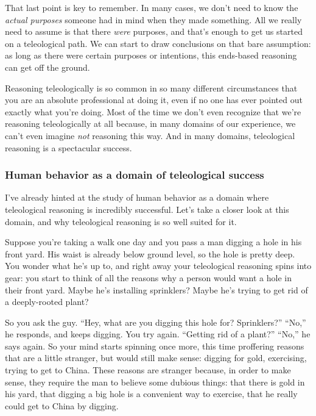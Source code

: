 		That last point is key to remember. In many cases, we don't need to know the \textit{actual purposes} someone had in mind when they made something. All we really need to assume is that there \textit{were} purposes, and that's enough to get us started on a teleological path. We can start to draw conclusions on that bare assumption: as long as there were certain purposes or intentions, this ends-based reasoning can get off the ground.
		
		Reasoning teleologically is so common in so many different circumstances that you are an absolute professional at doing it, even if no one has ever pointed out exactly what you're doing. Most of the time we don't even recognize that we're reasoning teleologically at all because, in many domains of our experience, we can't even imagine \textit{not} reasoning this way. And in many domains, teleological reasoning is a spectacular success.
		
	\subsubsection{Human behavior as a domain of teleological success}
		
		I've already hinted at the study of human behavior as a domain where teleological reasoning is incredibly successful. Let's take a closer look at this domain, and why teleological reasoning is so well suited for it.
		
		Suppose you're taking a walk one day and you pass a man digging a hole in his front yard. His waist is already below ground level, so the hole is pretty deep. You wonder what he's up to, and right away your teleological reasoning spins into gear: you start to think of all the reasons why a person would want a hole in their front yard. Maybe he's installing sprinklers? Maybe he's trying to get rid of a deeply-rooted plant? 
		
		So you ask the guy. ``Hey, what are you digging this hole for? Sprinklers?'' ``No,'' he responds, and keeps digging. You try again. ``Getting rid of a plant?'' ``No,'' he says again. So your mind starts spinning once more, this time proffering reasons that are a little stranger, but would still make sense: digging for gold, exercising, trying to get to China. These reasons are stranger because, in order to make sense, they require the man to believe some dubious things: that there is gold in his yard, that digging a big hole is a convenient way to exercise, that he really could get to China by digging. 
		
